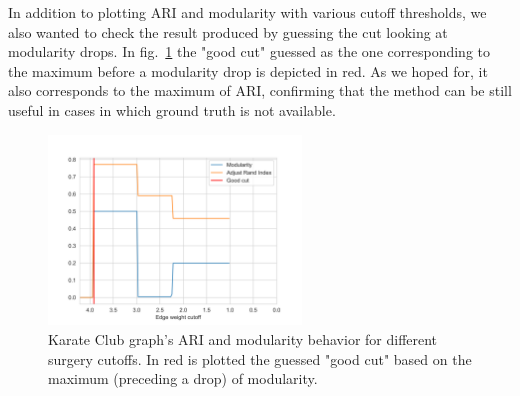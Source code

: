 In addition to plotting ARI and modularity with various cutoff thresholds, we also wanted to check the result produced by guessing the cut looking at modularity drops. In fig.~\ref{fig:Karate_Accuracy} the "good cut" guessed as the one corresponding to the maximum before a modularity drop is depicted in red. As we hoped for, it also corresponds to the maximum of ARI, confirming that the method can be still useful in cases in which ground truth is not available.
\begin{figure}
    \centering
    \includegraphics[width=0.6\textwidth]{../KarateClubResults/Surgery Accuracy.png}
    \caption{Karate Club graph’s ARI and modularity behavior for different surgery cutoffs. In red is plotted the guessed "good cut" based on the maximum (preceding a drop) of modularity.}
    \label{fig:Karate_Accuracy}
\end{figure}


